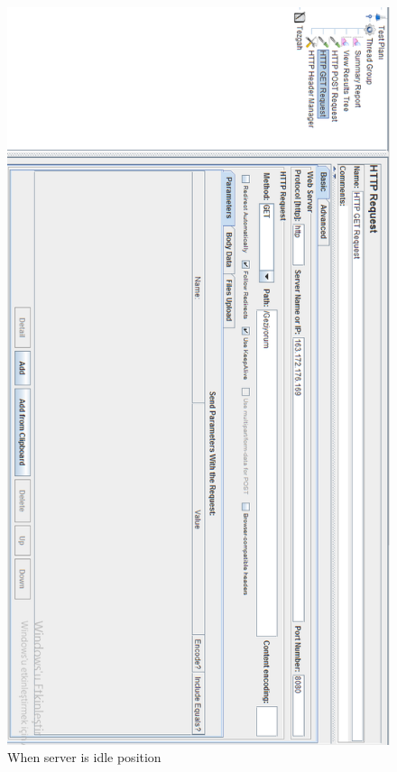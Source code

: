 \begin{figure}[!htbp]
\centering
\includegraphics[width=\textwidth]{projectChapters/images/exampleCall.png}
\caption{When server is idle position}
\label{fig:exampleCall}
\end{figure}

\newpage

